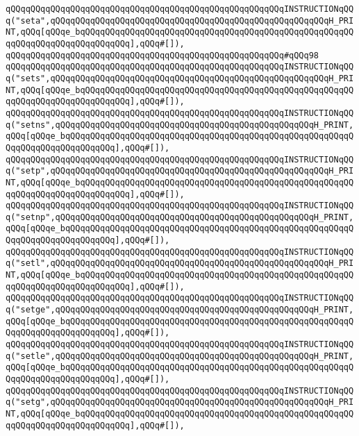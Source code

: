 \verb|qQQqqQQqqQQqqQQqqQQqqQQqqQQqqQQqqQQqqQQqqQQqqQQqqQQqqQQqINSTRUCTIONqQQq("seta",qQQqqQQqqQQqqQQqqQQqqQQqqQQqqQQqqQQqqQQqqQQqqQQqqQQqqQQqH_PRINT,qQQq[qQQqe_bqQQqqQQqqQQqqQQqqQQqqQQqqQQqqQQqqQQqqQQqqQQqqQQqqQQqqQQqqQQqqQQqqQQqqQQqqQQqqQQq],qQQq#[]),|\newline
\verb|qQQqqQQqqQQqqQQqqQQqqQQqqQQqqQQqqQQqqQQqqQQqqQQqqQQqqQQq#qQQq98|\newline
\verb|qQQqqQQqqQQqqQQqqQQqqQQqqQQqqQQqqQQqqQQqqQQqqQQqqQQqqQQqINSTRUCTIONqQQq("sets",qQQqqQQqqQQqqQQqqQQqqQQqqQQqqQQqqQQqqQQqqQQqqQQqqQQqqQQqH_PRINT,qQQq[qQQqe_bqQQqqQQqqQQqqQQqqQQqqQQqqQQqqQQqqQQqqQQqqQQqqQQqqQQqqQQqqQQqqQQqqQQqqQQqqQQqqQQq],qQQq#[]),|\newline
\verb|qQQqqQQqqQQqqQQqqQQqqQQqqQQqqQQqqQQqqQQqqQQqqQQqqQQqqQQqINSTRUCTIONqQQq("setns",qQQqqQQqqQQqqQQqqQQqqQQqqQQqqQQqqQQqqQQqqQQqqQQqqQQqH_PRINT,qQQq[qQQqe_bqQQqqQQqqQQqqQQqqQQqqQQqqQQqqQQqqQQqqQQqqQQqqQQqqQQqqQQqqQQqqQQqqQQqqQQqqQQqqQQq],qQQq#[]),|\newline
\verb|qQQqqQQqqQQqqQQqqQQqqQQqqQQqqQQqqQQqqQQqqQQqqQQqqQQqqQQqINSTRUCTIONqQQq("setp",qQQqqQQqqQQqqQQqqQQqqQQqqQQqqQQqqQQqqQQqqQQqqQQqqQQqqQQqH_PRINT,qQQq[qQQqe_bqQQqqQQqqQQqqQQqqQQqqQQqqQQqqQQqqQQqqQQqqQQqqQQqqQQqqQQqqQQqqQQqqQQqqQQqqQQqqQQq],qQQq#[]),|\newline
\verb|qQQqqQQqqQQqqQQqqQQqqQQqqQQqqQQqqQQqqQQqqQQqqQQqqQQqqQQqINSTRUCTIONqQQq("setnp",qQQqqQQqqQQqqQQqqQQqqQQqqQQqqQQqqQQqqQQqqQQqqQQqqQQqH_PRINT,qQQq[qQQqe_bqQQqqQQqqQQqqQQqqQQqqQQqqQQqqQQqqQQqqQQqqQQqqQQqqQQqqQQqqQQqqQQqqQQqqQQqqQQqqQQq],qQQq#[]),|\newline
\verb|qQQqqQQqqQQqqQQqqQQqqQQqqQQqqQQqqQQqqQQqqQQqqQQqqQQqqQQqINSTRUCTIONqQQq("setl",qQQqqQQqqQQqqQQqqQQqqQQqqQQqqQQqqQQqqQQqqQQqqQQqqQQqqQQqH_PRINT,qQQq[qQQqe_bqQQqqQQqqQQqqQQqqQQqqQQqqQQqqQQqqQQqqQQqqQQqqQQqqQQqqQQqqQQqqQQqqQQqqQQqqQQqqQQq],qQQq#[]),|\newline
\verb|qQQqqQQqqQQqqQQqqQQqqQQqqQQqqQQqqQQqqQQqqQQqqQQqqQQqqQQqINSTRUCTIONqQQq("setge",qQQqqQQqqQQqqQQqqQQqqQQqqQQqqQQqqQQqqQQqqQQqqQQqqQQqH_PRINT,qQQq[qQQqe_bqQQqqQQqqQQqqQQqqQQqqQQqqQQqqQQqqQQqqQQqqQQqqQQqqQQqqQQqqQQqqQQqqQQqqQQqqQQqqQQq],qQQq#[]),|\newline
\verb|qQQqqQQqqQQqqQQqqQQqqQQqqQQqqQQqqQQqqQQqqQQqqQQqqQQqqQQqINSTRUCTIONqQQq("setle",qQQqqQQqqQQqqQQqqQQqqQQqqQQqqQQqqQQqqQQqqQQqqQQqqQQqH_PRINT,qQQq[qQQqe_bqQQqqQQqqQQqqQQqqQQqqQQqqQQqqQQqqQQqqQQqqQQqqQQqqQQqqQQqqQQqqQQqqQQqqQQqqQQqqQQq],qQQq#[]),|\newline
\verb|qQQqqQQqqQQqqQQqqQQqqQQqqQQqqQQqqQQqqQQqqQQqqQQqqQQqqQQqINSTRUCTIONqQQq("setg",qQQqqQQqqQQqqQQqqQQqqQQqqQQqqQQqqQQqqQQqqQQqqQQqqQQqqQQqH_PRINT,qQQq[qQQqe_bqQQqqQQqqQQqqQQqqQQqqQQqqQQqqQQqqQQqqQQqqQQqqQQqqQQqqQQqqQQqqQQqqQQqqQQqqQQqqQQq],qQQq#[]),|\newline
